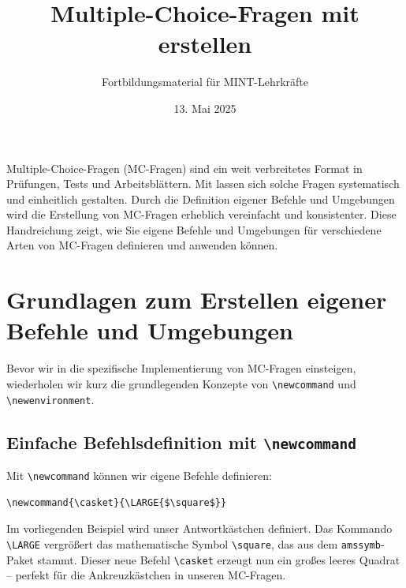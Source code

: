



\title{Multiple-Choice-Fragen mit  erstellen}
\author{Fortbildungsmaterial für MINT-Lehrkräfte}
\date{13. Mai 2025}
\pagestyle{plain}



\maketitle

Multiple-Choice-Fragen (MC-Fragen) sind ein weit verbreitetes Format in Prüfungen, Tests und Arbeitsblättern. Mit  lassen sich solche Fragen systematisch und einheitlich gestalten. Durch die Definition eigener Befehle und Umgebungen wird die Erstellung von MC-Fragen erheblich vereinfacht und konsistenter. Diese Handreichung zeigt, wie Sie eigene Befehle und Umgebungen für verschiedene Arten von MC-Fragen definieren und anwenden können.



\section{Grundlagen zum Erstellen eigener Befehle und Umgebungen}

Bevor wir in die spezifische Implementierung von MC-Fragen einsteigen, wiederholen wir kurz die grundlegenden Konzepte von \texttt{\textbackslash newcommand} und \texttt{\textbackslash newenvironment}.

\subsection{Einfache Befehlsdefinition mit \texttt{\textbackslash newcommand}}

Mit \texttt{\textbackslash newcommand} können wir eigene Befehle definieren:

\begin{lstlisting}[style=latex]
% Syntax: \newcommand{\befehlsname}[anzahl_parameter][standardwert]{definition}
\newcommand{\casket}{\LARGE{$\square$}}
\end{lstlisting}

Im vorliegenden Beispiel wird unser Antwortkästchen definiert.  Das Kommando \texttt{\textbackslash LARGE} vergrößert das mathematische Symbol \texttt{\textbackslash square}, das aus dem \texttt{amssymb}-Paket stammt. Dieser neue Befehl \texttt{\textbackslash casket} erzeugt nun ein großes leeres Quadrat – perfekt für die Ankreuzkästchen in unseren MC-Fragen. 


